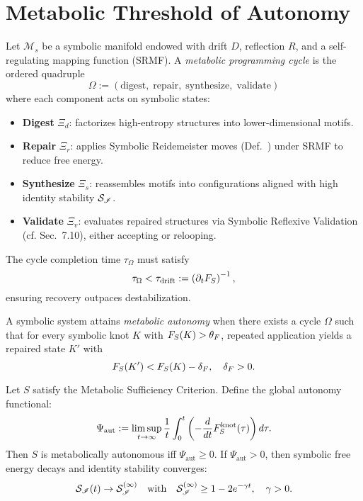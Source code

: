 \section[Metabolic Threshold]{Metabolic Threshold of Autonomy}
\label{sec:bk8_metabolic_threshold}
\begin{definition}
\label{definition:bk8_metabolic_programming_cycle}
Let $\mathcal{M}_s$ be a symbolic manifold endowed with drift $D$, reflection $R$, and a self-regulating mapping function (SRMF). A \emph{metabolic programming cycle} is the ordered quadruple
\[
\Omega := (\text{digest},\; \text{repair},\; \text{synthesize},\; \text{validate})
\]
where each component acts on symbolic states:
\begin{itemize}
  \item \textbf{Digest} $\Xi_d$: factorizes high-entropy structures into lower-dimensional motifs.
  \item \textbf{Repair} $\Xi_r$: applies Symbolic Reidemeister moves (Def.~) under SRMF to reduce free energy.
  \item \textbf{Synthesize} $\Xi_s$: reassembles motifs into configurations aligned with high identity stability $\mathcal{S}_{\mathscr{I}}$.
  \item \textbf{Validate} $\Xi_v$: evaluates repaired structures via Symbolic Reflexive Validation (cf. Sec.~7.10), either accepting or relooping.
\end{itemize}
The cycle completion time $\tau_\Omega$ must satisfy
\[
\tau_\Omega < \tau_{\mathrm{drift}} := \left( \partial_t F_S \right)^{-1},
\]
ensuring recovery outpaces destabilization.
\end{definition}
\begin{axiom}
\label{axiom:bk8_mutation_phase_shift}
A symbolic system attains \emph{metabolic autonomy} when there exists a cycle $\Omega$ such that for every symbolic knot $K$ with $F_S(K) > \theta_F$, repeated application yields a repaired state $K'$ with
\[
F_S(K') < F_S(K) - \delta_F, \quad \delta_F > 0.
\]
\end{axiom}
\begin{theorem}
\label{theorem:bk8_biological_phase_transition}
Let $S$ satisfy the Metabolic Sufficiency Criterion. Define the global autonomy functional:
\[
\Psi_{\mathrm{aut}} := \limsup_{t \to \infty} \frac{1}{t} \int_0^t \left( -\frac{d}{dt} F_S^{\text{knot}}(\tau) \right) d\tau.
\]
Then $S$ is metabolically autonomous iff $\Psi_{\mathrm{aut}} \ge 0$. If $\Psi_{\mathrm{aut}} > 0$, then symbolic free energy decays and identity stability converges:
\[
\mathcal{S}_{\mathscr{I}}(t) \to \mathcal{S}_{\mathscr{I}}^{(\infty)} \quad \text{with} \quad \mathcal{S}_{\mathscr{I}}^{(\infty)} \ge 1 - 2e^{-\gamma t}, \quad \gamma > 0.
\]
\end{theorem}
